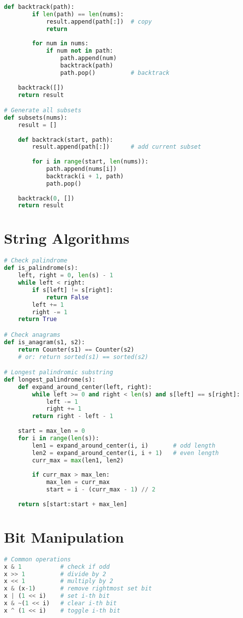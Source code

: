 \documentclass[9pt,a4paper]{article}
\begin{document}
\begin{multicols}{2}
\begin{lstlisting}[language=Python]
    def backtrack(path):
        if len(path) == len(nums):
            result.append(path[:])  # copy
            return
        
        for num in nums:
            if num not in path:
                path.append(num)
                backtrack(path)
                path.pop()          # backtrack
    
    backtrack([])
    return result

# Generate all subsets
def subsets(nums):
    result = []
    
    def backtrack(start, path):
        result.append(path[:])      # add current subset
        
        for i in range(start, len(nums)):
            path.append(nums[i])
            backtrack(i + 1, path)
            path.pop()
    
    backtrack(0, [])
    return result
\end{lstlisting}

\section*{String Algorithms}
\begin{lstlisting}[language=Python]
# Check palindrome
def is_palindrome(s):
    left, right = 0, len(s) - 1
    while left < right:
        if s[left] != s[right]:
            return False
        left += 1
        right -= 1
    return True

# Check anagrams
def is_anagram(s1, s2):
    return Counter(s1) == Counter(s2)
    # or: return sorted(s1) == sorted(s2)

# Longest palindromic substring
def longest_palindrome(s):
    def expand_around_center(left, right):
        while left >= 0 and right < len(s) and s[left] == s[right]:
            left -= 1
            right += 1
        return right - left - 1
    
    start = max_len = 0
    for i in range(len(s)):
        len1 = expand_around_center(i, i)       # odd length
        len2 = expand_around_center(i, i + 1)   # even length
        curr_max = max(len1, len2)
        
        if curr_max > max_len:
            max_len = curr_max
            start = i - (curr_max - 1) // 2
    
    return s[start:start + max_len]
\end{lstlisting}

\section*{Bit Manipulation}
\begin{lstlisting}[language=Python]
# Common operations
x & 1           # check if odd
x >> 1          # divide by 2
x << 1          # multiply by 2
x & (x-1)       # remove rightmost set bit
x | (1 << i)    # set i-th bit
x & ~(1 << i)   # clear i-th bit
x ^ (1 << i)    # toggle i-th bit


\end{lstlisting}
\end{multicols}
\end{document}
